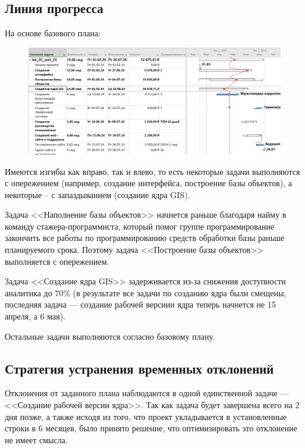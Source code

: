 \subsection*{Линия прогресса}

На основе базового плана:

\begin{figure}[h!]
	\begin{center}
		\includegraphics[scale=0.45]{inc/img/p_28.png}
	\end{center}
	\captionsetup{justification=centering}
	\label{fig:u3}
\end{figure}

Имеются изгибы как вправо, так и влево, то есть некоторые задачи выполняются с опережением (например, создание интерфейса, построение базы объектов), а некоторые – с запаздыванием (создание ядра GIS). 

Задача <<Наполнение базы объектов>> начнется раньше благодаря найму в команду стажера-программиста, который помог группе программирование закончить все работы по программированию средств обработки базы раньше планируемого срока. Поэтому задача <<Построение базы объектов>> выполняется с опережением.

Задача <<Создание ядра GIS>> задерживается из-за снижения доступности аналитика до 70\% (в результате все задачи по созданию ядра были смещены, последняя задача --- создание рабочей версиии ядра теперь начнется не 15 апреля, а 6 мая).

Остальные задачи выполняются согласно базовому плану.

\subsection*{Стратегия устранения временных отклонений}

Отклонения от заданного плана наблюдаются в одной единственной задаче --- <<Создание рабочей версии ядра>>. Так как задача будет завершена всего на 2 дня позже, а также исходя из того, что проект укладывается в установленные строки в 6 месяцев, было принято решение, что оптимизировать это отклонение не имеет смысла.

